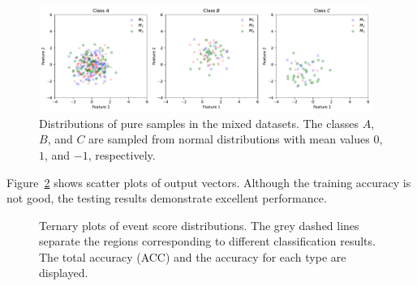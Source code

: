 \documentclass[12pt]{article}
\begin{document}
        \begin{figure}[htpb]
            \centering
            \includegraphics[width=0.97\textwidth]{multi-class_training_data-dominated_2.pdf}
            \caption{Distributions of pure samples in the mixed datasets. The classes $A$, $B$, and $C$ are sampled from normal distributions with mean values $0$, $1$, and $-1$, respectively.}
            \label{fig:pure_sample_distribution_dominated_2}
        \end{figure}  

        Figure~\ref{fig:event_score_distribution_dominated_2} shows scatter plots of output vectors. Although the training accuracy is not good, the testing results demonstrate excellent performance.
        \begin{figure}[htpb]
            \centering
            \caption{Ternary plots of event score distributions. The grey dashed lines separate the regions corresponding to different classification results. The total accuracy (ACC) and the accuracy for each type are displayed.}
            \label{fig:event_score_distribution_dominated_2}
        \end{figure}
\end{document}
